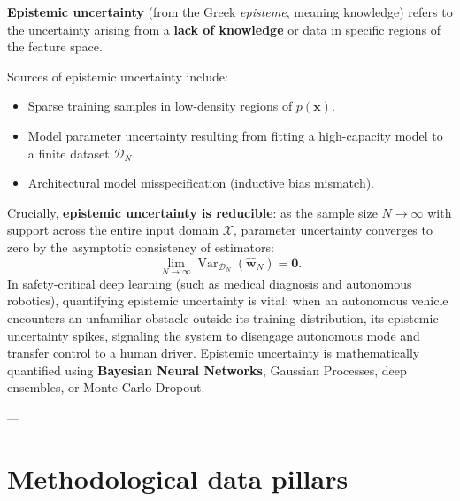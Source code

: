 \textbf{Epistemic uncertainty} (from the Greek \emph{episteme}, meaning knowledge) refers to the uncertainty arising from a \textbf{lack of knowledge} or data in specific regions of the feature space. 

Sources of epistemic uncertainty include:
\begin{itemize}[noitemsep]
  \item Sparse training samples in low-density regions of $p(\mathbf{x})$.
  \item Model parameter uncertainty resulting from fitting a high-capacity model to a finite dataset $\mathcal{D}_N$.
  \item Architectural model misspecification (inductive bias mismatch).
\end{itemize}

Crucially, \textbf{epistemic uncertainty is reducible}: as the sample size $N \to \infty$ with support across the entire input domain $\mathcal{X}$, parameter uncertainty converges to zero by the asymptotic consistency of estimators:
\begin{equation}
\lim_{N \to \infty} \operatorname{Var}_{\mathcal{D}_N}(\hat{\mathbf{w}}_N) = \mathbf{0}.
\end{equation}
In safety-critical deep learning (such as medical diagnosis and autonomous robotics), quantifying epistemic uncertainty is vital: when an autonomous vehicle encounters an unfamiliar obstacle outside its training distribution, its epistemic uncertainty spikes, signaling the system to disengage autonomous mode and transfer control to a human driver. Epistemic uncertainty is mathematically quantified using \textbf{Bayesian Neural Networks}, Gaussian Processes, deep ensembles, or Monte Carlo Dropout.

---

\section{Methodological data pillars}
\label{sec:how_to_deal_with_data}


